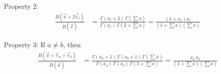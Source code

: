 \documentclass{article}
\theoremstyle{definition}
\begin{document}
Property 2:
\begin{align*}
\frac{B(\vec x + 2\vec e_\ell)}{B(\vec x)}
&= \frac{\Gamma(x_\ell + 2) \, \Gamma(\sum x)}
        {\Gamma(x_\ell) \, \Gamma(2 + \sum x)}
= \frac{(1 + x_\ell) x_\ell}{(1 + \sum x) (\sum x)}
\end{align*}

Property 3: If $a \neq b$, then
\begin{align*}
\frac{B(\vec x + \vec e_a + \vec e_b)}{B(\vec x)}
&= \frac{\Gamma(x_a + 1) \, \Gamma(x_b + 1) \, \Gamma(\sum x)}
        {\Gamma(x_a) \, \Gamma(x_b) \, \Gamma(2 + \sum x)}
= \frac{x_a \, x_b}{(1 + \sum x) (\sum x)}
\end{align*}
\end{document}
